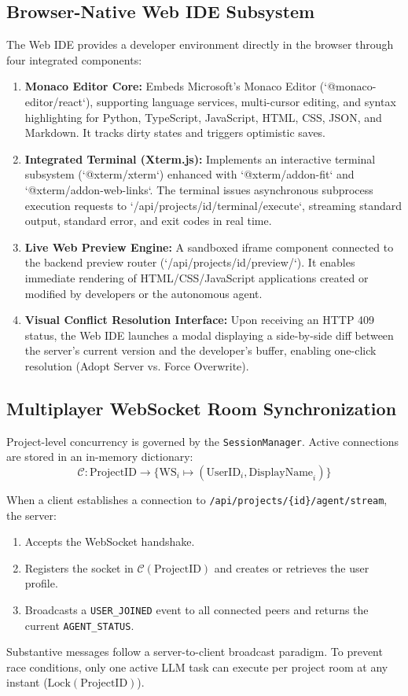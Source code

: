 \documentclass[conference]{IEEEtran}
\begin{document}
\subsection{Browser-Native Web IDE Subsystem}
The Web IDE provides a developer environment directly in the browser through four integrated components:
\begin{enumerate}
    \item \textbf{Monaco Editor Core:} Embeds Microsoft's Monaco Editor (`@monaco-editor/react`), supporting language services, multi-cursor editing, and syntax highlighting for Python, TypeScript, JavaScript, HTML, CSS, JSON, and Markdown. It tracks dirty states and triggers optimistic saves.
    \item \textbf{Integrated Terminal (Xterm.js):} Implements an interactive terminal subsystem (`@xterm/xterm`) enhanced with `@xterm/addon-fit` and `@xterm/addon-web-links`. The terminal issues asynchronous subprocess execution requests to `/api/projects/{id}/terminal/execute`, streaming standard output, standard error, and exit codes in real time.
    \item \textbf{Live Web Preview Engine:} A sandboxed iframe component connected to the backend preview router (`/api/projects/{id}/preview/`). It enables immediate rendering of HTML/CSS/JavaScript applications created or modified by developers or the autonomous agent.
    \item \textbf{Visual Conflict Resolution Interface:} Upon receiving an HTTP 409 status, the Web IDE launches a modal displaying a side-by-side diff between the server's current version and the developer's buffer, enabling one-click resolution (Adopt Server vs. Force Overwrite).
\end{enumerate}

\subsection{Multiplayer WebSocket Room Synchronization}
Project-level concurrency is governed by the \texttt{SessionManager}. Active connections are stored in an in-memory dictionary:
\begin{equation}
\mathcal{C}: \text{ProjectID} \rightarrow \{ \text{WS}_i \mapsto (\text{UserID}_i, \text{DisplayName}_i) \}
\end{equation}

When a client establishes a connection to \texttt{/api/projects/\{id\}/agent/stream}, the server:
\begin{enumerate}
    \item Accepts the WebSocket handshake.
    \item Registers the socket in $\mathcal{C}(\text{ProjectID})$ and creates or retrieves the user profile.
    \item Broadcasts a \texttt{USER\_JOINED} event to all connected peers and returns the current \texttt{AGENT\_STATUS}.
\end{enumerate}
Substantive messages follow a server-to-client broadcast paradigm. To prevent race conditions, only one active LLM task can execute per project room at any instant ($\text{Lock}(\text{ProjectID})$).
\end{document}
